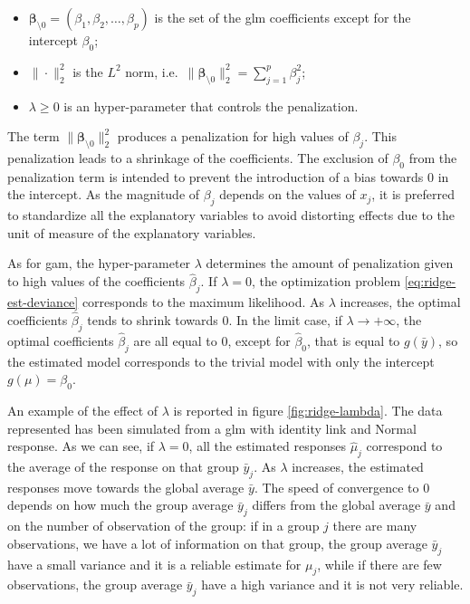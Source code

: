 \documentclass[a4paper, twoside, openright, 12pt]{report}
\providecommand{\tightlist}{%
  \setlength{\itemsep}{0pt}\setlength{\parskip}{0pt}}
\theoremstyle{definition}
\theoremstyle{definition}
\theoremstyle{definition}
\theoremstyle{remark}
\begin{document}
\begin{itemize}
\tightlist
\item
  \(\boldsymbol{\beta}_{\setminus0} = \left(\beta_1, \beta_2, \dots, \beta_p\right)\) is the set of the \ac{glm} coefficients except for the intercept \(\beta_0\);
\item
  \(\|\cdot\|_2^2\) is the \(L^2\) norm, i.e.~\(\|\boldsymbol{\beta}_{\setminus0}\|_2^2 = \sum_{j=1}^p{\beta_j^2}\);
\item
  \(\lambda\ge0\) is an hyper-parameter that controls the penalization.
\end{itemize}

The term \(\|\boldsymbol{\beta}_{\setminus0}\|_2^2\) produces a penalization for high values of \(\beta_j\). This penalization leads to a shrinkage of the coefficients.
The exclusion of \(\beta_0\) from the penalization term is intended to prevent the introduction of a bias towards \(0\) in the intercept. As the magnitude of \(\beta_j\) depends on the values of \(x_j\), it is preferred to standardize all the explanatory variables to avoid distorting effects due to the unit of measure of the explanatory variables.

As for \ac{gam}, the hyper-parameter \(\lambda\) determines the amount of penalization given to high values of the coefficients \(\hat{\beta}_j\). If \(\lambda=0\), the optimization problem \eqref{eq:ridge-est-deviance} corresponds to the maximum likelihood. As \(\lambda\) increases, the optimal coefficients \(\hat{\beta}_j\) tends to shrink towards \(0\). In the limit case, if \(\lambda\to+\infty\), the optimal coefficients \(\hat{\beta}_j\) are all equal to \(0\), except for \(\hat{\beta}_0\), that is equal to \(g(\bar{y})\), so the estimated model corresponds to the trivial model with only the intercept \(g(\mu)=\beta_0\).

An example of the effect of \(\lambda\) is reported in figure \ref{fig:ridge-lambda}. The data represented has been simulated from a \ac{glm} with identity link and Normal response. As we can see, if \(\lambda=0\), all the estimated responses \(\hat{\mu}_j\) correspond to the average of the response on that group \(\bar{y}_j\). As \(\lambda\) increases, the estimated responses move towards the global average \(\bar{y}\). The speed of convergence to \(0\) depends on how much the group average \(\bar{y}_j\) differs from the global average \(\bar{y}\) and on the number of observation of the group: if in a group \(j\) there are many observations, we have a lot of information on that group, the group average \(\bar{y}_j\) have a small variance and it is a reliable estimate for \(\mu_j\), while if there are few observations, the group average \(\bar{y}_j\) have a high variance and it is not very reliable.
\end{document}
